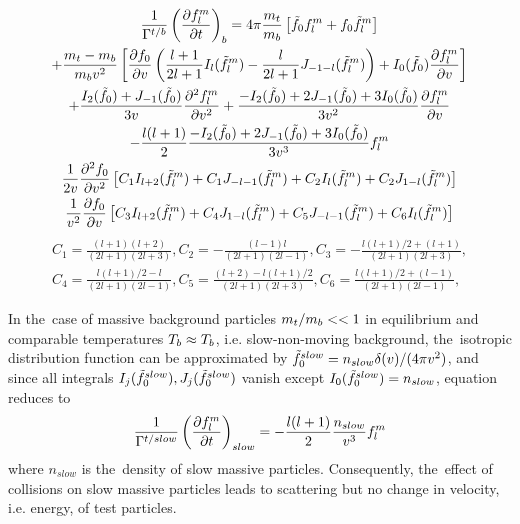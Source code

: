 \begin{multline}
  \frac{1}{\Gamma^{t/b}}\left(\frac{\partial{f_l^m}}{\partial{t}}\right)_{b} = 
  4\pi\frac{m_t}{m_b} \left[\tilde{f}_0 f_l^m + f_0 \tilde{f}_l^m \right] 
  \\
  + \frac{m_t-m_b}{m_b v^2} \left[ \frac{\partial{f_0}}{\partial{v}}
  \left(\frac{l+1}{2 l+1} I_l(\tilde{f}_l^m) 
  - \frac{l}{2 l +1} J_{-1-l}(\tilde{f}_l^m)\right) 
  + I_0(\tilde{f}_0)\frac{\partial{f_l^m}}{\partial{v}}\right] 
  \\
  + \frac{I_2(\tilde{f}_0) + J_{-1}(\tilde{f}_0)}{3v}
  \frac{\partial^2 f_l^m}{\partial v^2} + 
  \frac{-I_2(\tilde{f}_0) + 2 J_{-1}(\tilde{f}_0) + 3 I_0(\tilde{f}_0)}{3v^2}
  \frac{\partial{f_l^m}}{\partial{v}}
  \\
  - \frac{l(l+1)}{2}
  \frac{-I_2(\tilde{f}_0) + 2 J_{-1}(\tilde{f}_0) + 3 I_0(\tilde{f}_0)}{3v^3} f_l^m 
  \\
  \frac{1}{2 v} \frac{\partial^2 f_0}{\partial v^2}
  \left[C_1 I_{l+2}(\tilde{f}_l^m) + C_1 J_{-l-1}(\tilde{f}_l^m) + C_2 I_l(\tilde{f}_l^m) 
  + C_2 J_{1-l}(\tilde{f}_l^m) \right]
  \\
  \frac{1}{v^2} \frac{\partial{f_0}}{\partial{v}}
  \left[C_3 I_{l+2}(\tilde{f}_l^m) + C_4 J_{1-l}(\tilde{f}_l^m) + C_5 J_{-l-1}(\tilde{f}_l^m) 
  + C_6 I_l(\tilde{f}_l^m) \right]
  \label{eq:FP_flm}
\end{multline}
\begin{eqnarray}
  C_1 = \frac{(l+1)(l+2)}{(2l+1)(2l+3)}, 
  C_2 = -\frac{(l-1)l}{(2l +1)(2l-1)},
  C_3 = -\frac{l(l+1)/2 + (l+1)}{(2l+1)(2l+3)},
  \nonumber \\
  C_4 = \frac{l(l+1)/2 - l}{(2l+1)(2l-1)},
  C_5 = \frac{(l+2) - l(l+1)/2}{(2l+1)(2l+3)}, 
  C_6 = \frac{l(l+1)/2 + (l-1)}{(2l+1)(2l-1)}, 
  \nonumber
\end{eqnarray}

In the~case of massive background particles $m_t / m_b << 1$ in equilibrium
and comparable temperatures $T_b\approx T_b$, 
i.e. slow-non-moving background, 
the~isotropic distribution function can be approximated by 
$\tilde{f}_0^{slow} = n_{slow} \delta(v) / (4\pi v^2)$, 
and since all integrals 
$I_j(\tilde{f}_0^{slow}), J_j(\tilde{f}_0^{slow})$ vanish except 
$I_0(\tilde{f}_0^{slow}) = n_{slow}$, equation  reduces to 
\begin{equation}
  \frac{1}{\Gamma^{t/slow}}\left(\frac{\partial{f_l^m}}{\partial{t}}\right)_{slow} = 
  - \frac{l(l+1)}{2}
  \frac{n_{slow}}{v^3} f_l^m 
  \label{eq:FP_flm_slow}
\end{equation} 
where $n_{slow}$ is the~density of slow massive particles. Consequently, 
the~effect of collisions on slow massive particles leads to scattering but no
change in velocity, i.e. energy, of test particles.

